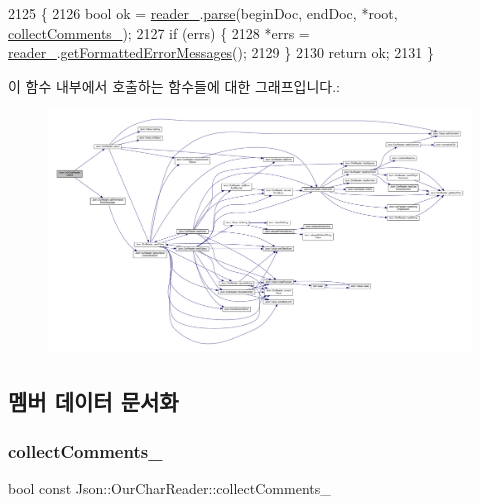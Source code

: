 \begin{DoxyCode}
2125                                                           \{
2126     \textcolor{keywordtype}{bool} ok = \hyperlink{class_json_1_1_our_char_reader_aedd4520b8570654ed7aa0726075ee58d}{reader\_}.\hyperlink{class_json_1_1_our_reader_aba4f8749aab7f02ec17f107e392caf80}{parse}(beginDoc, endDoc, *root, 
      \hyperlink{class_json_1_1_our_char_reader_aa6afd3d0f754cadad0f6d2be38bcfee0}{collectComments\_});
2127     \textcolor{keywordflow}{if} (errs) \{
2128       *errs = \hyperlink{class_json_1_1_our_char_reader_aedd4520b8570654ed7aa0726075ee58d}{reader\_}.\hyperlink{class_json_1_1_our_reader_a7971de51d73bb4aee5b0c4742c4aaaac}{getFormattedErrorMessages}();
2129     \}
2130     \textcolor{keywordflow}{return} ok;
2131   \}
\end{DoxyCode}
이 함수 내부에서 호출하는 함수들에 대한 그래프입니다.\+:\nopagebreak
\begin{figure}[H]
\begin{center}
\leavevmode
\includegraphics[width=350pt]{class_json_1_1_our_char_reader_a547f08ec5a9951ca69e8bb2e90296c83_cgraph}
\end{center}
\end{figure}


\subsection{멤버 데이터 문서화}
\mbox{\label{class_json_1_1_our_char_reader_aa6afd3d0f754cadad0f6d2be38bcfee0}} 
\subsubsection{\texorpdfstring{collect\+Comments\+\_\+}{collectComments\_}}
{\footnotesize\ttfamily bool const Json\+::\+Our\+Char\+Reader\+::collect\+Comments\+\_\+\hspace{0.3cm}{\ttfamily [private]}}



